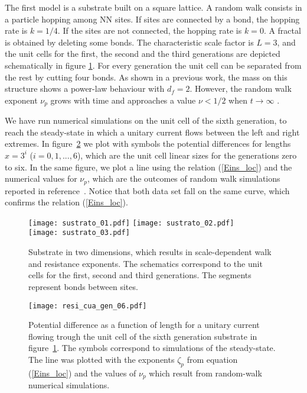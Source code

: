 \documentclass[12pt]{iopart}
\begin{document}
The first model is a substrate built on a square lattice. A random walk 
consists in a particle hopping among NN sites.
If sites are connected by a bond, the hopping rate is $k=1/4$. If
the sites are not connected, the hopping rate is $k=0$. 
A fractal is obtained by deleting some bonds. The characteristic scale 
factor is $L=3$, and the unit cells for the
first, the second and the third generations are depicted
schematically in figure \ref{sustratos}. For every generation the unit cell can be separated from the
rest by cutting four bonds.  As shown in a previous work, the mass on this
structure shows a power-law  behaviour with $d_f=2$. However, the random walk
exponent $\nu_p$ grows with time  and approaches a value
$\nu<1/2$ when $t\to\infty$ \cite{Padilla2010}.

We have run numerical simulations on the unit cell of the sixth generation,
to reach the steady-state in which a unitary current  flows between the 
left and right extremes. In figure~\ref{V_x_cua} we plot with symbols
the potential differences for lengths $x=3^i$ ($i=0,1,...,6$), which
are the unit cell linear sizes for the generations zero to
six. In the same figure, we plot a line using the relation (\ref{Eins_loc})
 and the numerical values for $\nu_p$, which are the
 outcomes of random walk simulations reported in reference~\cite{Padilla2010}. 
 Notice that both data set
 fall on  the same curve, which confirms the relation
 (\ref{Eins_loc}).

\begin{figure}[!ht]
	\begin{center}
    \texttt{[image: sustrato\_01.pdf]}
		\hspace*{1.cm}	
	 \texttt{[image: sustrato\_02.pdf]}\\
 \texttt{[image: sustrato\_03.pdf]}
 \end{center}
	\caption{Substrate in two dimensions,
    which results in scale-dependent  walk and resistance exponents.
    The schematics correspond to the unit cells for the first, second and third
    generations. The segments represent bonds between sites.}
\label{sustratos}
\end{figure}

\begin{figure}[!ht]
	\begin{center}
	 \texttt{[image: resi\_cua\_gen\_06.pdf]}	  
 \end{center}
	\caption{Potential difference as a function of length for a unitary
     current flowing trough the unit cell of the sixth generation substrate in
     figure~\ref{sustratos}. The symbols correspond to simulations of the
     steady-state. The line was plotted with the exponents $\zeta_p$ from 
     equation (\ref{Eins_loc}) and the values of $\nu_p$ which result  from
     random-walk numerical simulations. 
	}
        \label{V_x_cua}
\end{figure}
\end{document}
